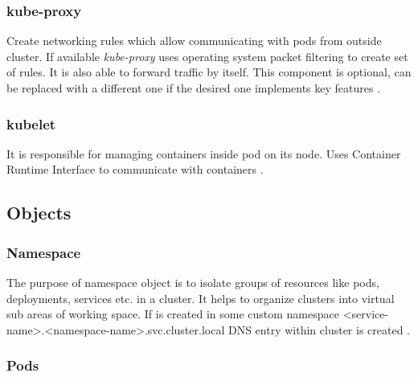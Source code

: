 

\subsubsection{kube-proxy}
\label{sec:kubeProxy}

Create networking rules which allow communicating with pods from outside cluster. If available \textit{kube-proxy} uses operating system packet filtering to create set of rules. It is also able to forward traffic by itself. This component is optional, can be replaced with a different one if the desired one implements key features \cite{KubernetesDocs}.


\subsubsection{kubelet}
\label{sec:kubelet}

It is responsible for managing containers inside pod on its node. Uses Container Runtime Interface to communicate with containers \cite{KubernetesDocs}.


\subsection{Objects}    
\label{sec:k8s_objects}

\subsubsection{Namespace}
\label{sec:namespace}

The purpose of namespace object is to isolate groups of resources like pods, deployments, services etc. in a cluster. It helps to organize clusters into virtual sub areas of working space. If \textit{} is created in some custom namespace <service-name>.<namespace-name>.svc.cluster.local DNS entry within cluster is created \cite{KubernetesDocs}.

\subsubsection{Pods}
\label{sec:pods}

